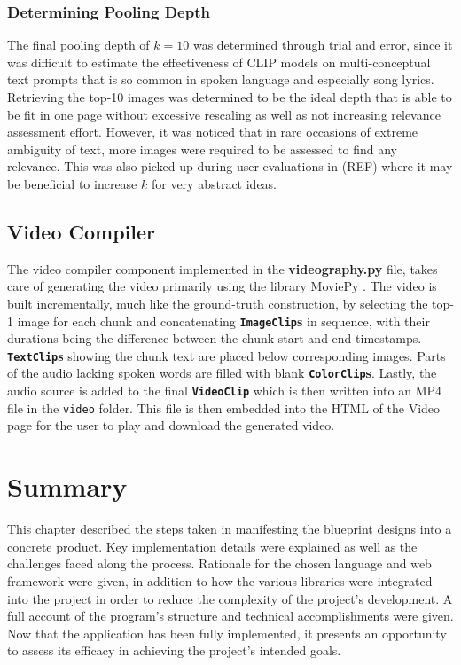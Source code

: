 \documentclass{l4proj}
\begin{document}
\subsubsection{Determining Pooling Depth}
The final pooling depth of $k=10$ was determined through trial and error, since it was difficult to estimate the effectiveness of CLIP models on multi-conceptual text prompts that is so common in spoken language and especially song lyrics. Retrieving the top-10 images was determined to be the ideal depth that is able to be fit in one page without excessive rescaling as well as not increasing relevance assessment effort. However, it was noticed that in rare occasions of extreme ambiguity of text, more images were required to be assessed to find any relevance. This was also picked up during user evaluations in (REF) where it may be beneficial to increase $k$ for very abstract ideas.


\subsection{Video Compiler}
The video compiler component implemented in the \textbf{videography.py} file, takes care of generating the video primarily using the library MoviePy \citep{moviepy}. The video is built incrementally, much like the ground-truth construction, by selecting the top-1 image for each chunk and concatenating \textbf{\lstinline|ImageClip|s} in sequence, with their durations being the difference between the chunk start and end timestamps. \textbf{\lstinline|TextClip|s} showing the chunk text are placed below corresponding images. Parts of the audio lacking spoken words are filled with blank \textbf{\lstinline|ColorClip|s}. Lastly, the audio source is added to the final \textbf{\lstinline|VideoClip|} which is then written into an MP4 file in the \lstinline|video| folder. This file is then embedded into the HTML of the Video page for the user to play and download the generated video.


\section{Summary}
This chapter described the steps taken in manifesting the blueprint designs into a concrete product. Key implementation details were explained as well as the challenges faced along the process. Rationale for the chosen language and web framework were given, in addition to how the various libraries were integrated into the project in order to reduce the complexity of the project's development. A full account of the program's structure and technical accomplishments were given. Now that the application has been fully implemented, it presents an opportunity to assess its efficacy in achieving the project's intended goals.
\end{document}
